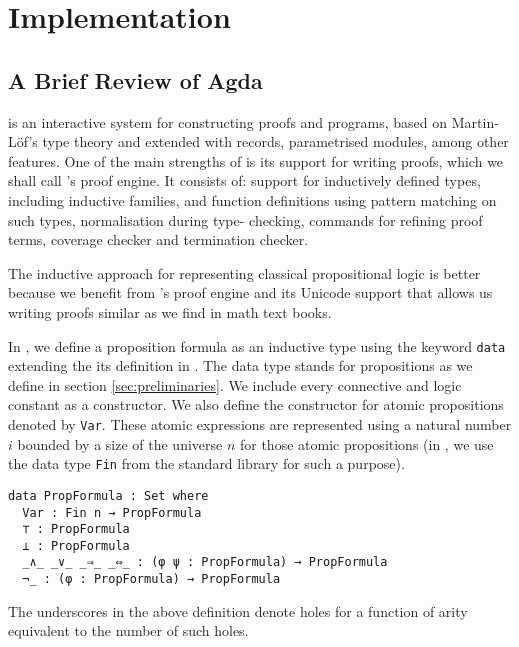 \documentclass[../main.tex]{subfiles}
\begin{document}

\section{Implementation}
\label{sec:implementation}


\subsection{A Brief Review of Agda}
\label{ssec:agda-definition}

\Agda is an interactive system for constructing proofs and programs,
based on Martin-L\"{o}f's type theory and extended with records,
parametrised modules, among other features. One of the main
strengths of \Agda is its support for writing proofs, which we shall
call \Agda's proof engine. It consists of: support for inductively
defined types, including inductive families, and function
definitions using pattern matching on such types, normalisation
during type- checking, commands for refining proof terms, coverage
checker and termination checker.

The inductive approach for representing classical propositional
logic is better because we benefit from \Agda's proof engine and its
Unicode support that allows us writing proofs similar as we find in
math text books.

In \Agda, we define a proposition formula
as an inductive type using the keyword \texttt{data} extending the
its definition in \cite{Altenkirch2015}.
The  data type stands for propositions
as we define in section \ref{sec:preliminaries}.
We include every connective and logic constant as a constructor.
We also define the constructor for atomic propositions denoted by
\verb!Var!. These atomic expressions are represented using a natural
number $i$ bounded by a size of the universe $n$ for those atomic
propositions (in \Agda, we use the data type \verb!Fin! from the
standard  library for such a purpose).

\begin{verbatim}
data PropFormula : Set where
  Var : Fin n → PropFormula
  ⊤ : PropFormula
  ⊥ : PropFormula
  _∧_ _∨_ _⇒_ _⇔_ : (φ ψ : PropFormula) → PropFormula
  ¬_ : (φ : PropFormula) → PropFormula
\end{verbatim}

\begin{remark}
The underscores in the above definition denote holes for a function of arity equivalent to the number of such holes.
\end{remark}
\end{document}
